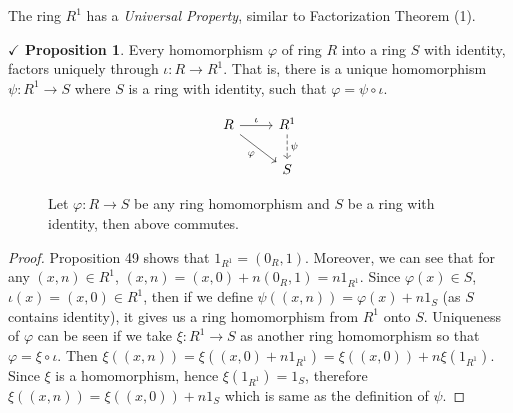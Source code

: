 \documentclass{article}
\theoremstyle{definition}
\theoremstyle{remark}
\theoremstyle{definition}
\theoremstyle{definition}
\newtheorem{proposition}{$\checkmark$ Proposition}
\theoremstyle{definition}
\theoremstyle{proof}
\begin{document}
The ring $ R^1 $ has a \emph{Universal Property}, similar to Factorization Theorem (1).
\begin{proposition}
	Every homomorphism $ \varphi $ of ring $ R $ into a ring $ S $ with identity, factors uniquely through $ \iota: R\to R^1 $. That is, there is a unique homomorphism $ \psi : R^1 \to S $ where $ S $ is a ring with identity, such that $ \varphi = \psi\circ\iota $.
	\begin{figure}[h!]
\[\begin{tikzcd}
	R \arrow{r}{\iota} \arrow[swap]{dr}{\varphi}&R^1\arrow[dashed]{d}{\psi}\\
	&S
\end{tikzcd}\]
\caption{Let $ \varphi : R\to S$ be any ring homomorphism and $ S $ be a ring with identity, then above commutes.}	
\end{figure}
\end{proposition}
\begin{proof}
	Proposition 49 shows that $ 1_{R^1} = (0_R,1) $. Moreover, we can see that for any $ (x,n)\in R^1 $, $ (x,n) = (x,0) + n(0_R,1) = n1_{R^1} $. Since $ \varphi(x)\in S $, $ \iota(x)= (x,0)\in R^1 $, then if we define $ \psi((x,n)) = \varphi(x) + n1_S$ (as $ S $ contains identity), it gives us a ring homomorphism from $R^1$ onto $ S $. Uniqueness of $ \varphi $ can be seen if we take $ \xi :R^1 \to S $ as another ring homomorphism so that $ \varphi = \xi \circ \iota $. Then $ \xi ((x,n)) = \xi((x,0) + n1_{R^1}) = \xi((x,0)) + n\xi(1_{R^1}) $. Since $ \xi $ is a homomorphism, hence $ \xi(1_{R^1}) = 1_S $, therefore $ \xi((x,n)) = \xi((x,0)) + n1_S $ which is same as the definition of $ \psi $.
\end{proof}
\hrulefill
\newpage
\end{document}
